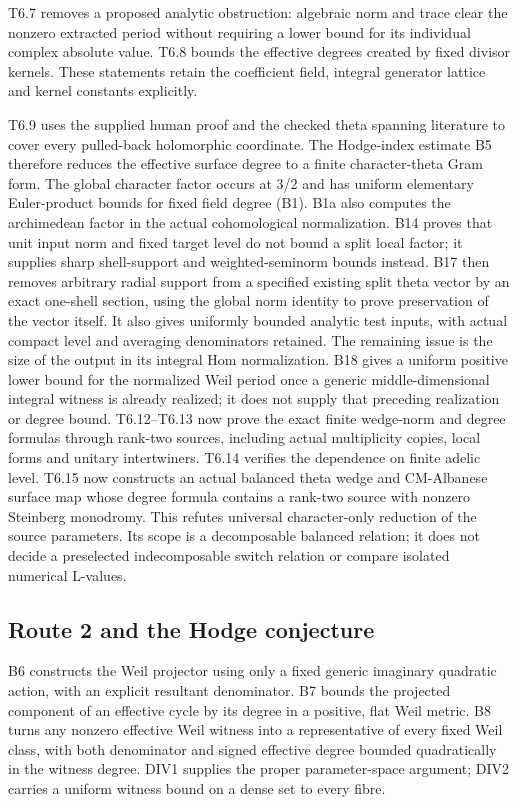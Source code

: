 \documentclass[11pt,a4paper]{article}
\theoremstyle{definition}
\begin{document}
T6.7 removes a proposed analytic obstruction: algebraic norm and trace
clear the nonzero extracted period without requiring a lower bound for
its individual complex absolute value. T6.8 bounds the effective degrees
created by fixed divisor kernels. These statements retain the
coefficient field, integral generator lattice and kernel constants
explicitly.

T6.9 uses the supplied human proof and the checked theta spanning
literature to cover every pulled-back holomorphic coordinate. The
Hodge-index estimate B5 therefore reduces the effective surface degree
to a finite character-theta Gram form. The global character factor
occurs at 3/2 and has uniform elementary Euler-product bounds for fixed
field degree (B1). B1a also computes the archimedean factor in the
actual cohomological normalization. B14 proves that unit input norm and
fixed target level do not bound a split local factor; it supplies sharp
shell-support and weighted-seminorm bounds instead. B17 then removes
arbitrary radial support from a specified existing split theta vector by
an exact one-shell section, using the global norm identity to prove
preservation of the vector itself. It also gives uniformly bounded
analytic test inputs, with actual compact level and averaging
denominators retained. The remaining issue is the size of the output in
its integral Hom normalization. B18 gives a uniform positive lower bound
for the normalized Weil period once a generic middle-dimensional
integral witness is already realized; it does not supply that preceding
realization or degree bound. T6.12--T6.13 now prove the exact finite
wedge-norm and degree formulas through rank-two sources, including
actual multiplicity copies, local forms and unitary intertwiners. T6.14
verifies the dependence on finite adelic level. T6.15 now constructs an
actual balanced theta wedge and CM-Albanese surface map whose degree
formula contains a rank-two source with nonzero Steinberg monodromy.
This refutes universal character-only reduction of the source
parameters. Its scope is a decomposable balanced relation; it does not
decide a preselected indecomposable switch relation or compare isolated
numerical L-values.

\subsection{Route 2 and the Hodge
conjecture}\label{route-2-and-the-hodge-conjecture}

B6 constructs the Weil projector using only a fixed generic imaginary
quadratic action, with an explicit resultant denominator. B7 bounds the
projected component of an effective cycle by its degree in a positive,
flat Weil metric. B8 turns any nonzero effective Weil witness into a
representative of every fixed Weil class, with both denominator and
signed effective degree bounded quadratically in the witness degree.
DIV1 supplies the proper parameter-space argument; DIV2 carries a
uniform witness bound on a dense set to every fibre.
\end{document}
